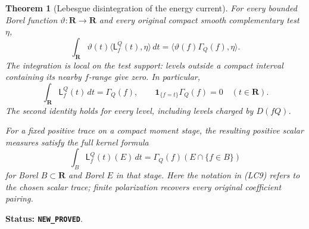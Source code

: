 \documentclass[11pt,a4paper]{article}
\numberwithin{equation}{section}
\newtheorem{theorem}{Theorem}[section]
\theoremstyle{definition}
\theoremstyle{remark}
\begin{document}
\begin{theorem}[Lebesgue disintegration of the energy current]
\label{thm:r11-level-coarea}
For every bounded Borel function $\vartheta:\mathbf R\to\mathbf R$
and every original compact smooth complementary test $\eta$,
\[
 \int_{\mathbf R}\vartheta(t)
                 \langle\mathsf L^Q_f(t),\eta\rangle\,dt
       =\langle\vartheta(f)\Gamma_Q(f),\eta\rangle.
 \tag{LC7}
\]
The integration is local on the test support: levels outside a
compact interval containing its nearby $f$-range give zero.
In particular,
\[
 \int_{\mathbf R}\mathsf L^Q_f(t)\,dt=\Gamma_Q(f),
 \qquad
 \mathbf1_{\{f=t\}}\Gamma_Q(f)=0\quad(t\in\mathbf R).
 \tag{LC8}
\]
The second identity holds for every level, including levels
charged by $D(fQ)$.

For a fixed positive trace on a compact moment stage, the resulting
positive scalar measures satisfy the full kernel formula
\[
 \int_B \mathsf L^Q_f(t)(E)\,dt
       =\Gamma_Q(f)(E\cap\{f\in B\})
 \tag{LC9}
\]
for Borel $B\subset\mathbf R$ and Borel $E$ in that stage.
Here the notation in (LC9) refers to the chosen scalar trace;
finite polarization recovers every original coefficient pairing.
\end{theorem}

\noindent\textbf{Status: \texttt{NEW\_PROVED}}.
\end{document}
